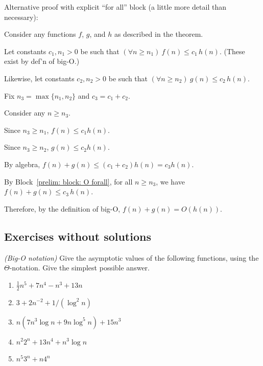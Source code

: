 \documentclass[11pt]{article}
\begin{document}
Alternative proof with explicit ``for all'' block (a little more detail than necessary):

\begin{longFormProof}

  \step Consider any functions $f$, $g$, and $h$ as described in the theorem.

  \step Let constants $c_1, n_1>0$ be such that
  $(\forall n \ge n_1)~ f(n) \le c_1\, h(n)$.  (These exist by def'n of big-O.)
  
  \step Likewise, let constants $c_2, n_2>0$ be such that
  $(\forall n \ge n_2)~ g(n) \le c_2\, h(n)$.

  \step Fix $n_3 = \max\{n_1, n_2\}$ and $c_3 = c_1 + c_2$.

  \begin{block}\label{prelim: block: O forall}
    \step Consider any $n\ge n_3$.

    \step Since $n_3 \ge n_1$,  $f(n) \le c_1 h(n)$. 

    \step Since $n_3 \ge n_2$,  $g(n) \le c_2 h(n)$.

    \step By algebra, $f(n) + g(n) \le (c_1 + c_2) h(n) = c_3 h(n)$.
  \end{block}    

  \step By Block~\ref{prelim: block: O forall}, for all $n \ge n_3$, we have $f(n) + g(n) \le c_3 \,h(n)$.

  \step Therefore, by the definition of big-O, $f(n) + g(n) = O(h(n))$. 
  
\end{longFormProof}

\subsection{Exercises without solutions}

\exercise \emph{(Big-O notation)}
Give the asymptotic values of the following functions, using the $\Theta$-notation.
Give the simplest possible answer.
%
%
\begin{enumerate}[label=(\alph*)]
\item $\frac{1}{2} n^5 + 7 n^4 - n^3 + 13n$
\item $3 + 2n^{-2} + 1/(\log^2 n)$
\item $n ( 7n^3\log n + 9 n\log^5n) + 15n^3$
\item $n^2 2^n + 13n^4 + n^3\log n$
\item $n^5 3^n + n 4^n$
\end{enumerate}
% 
\end{document}
